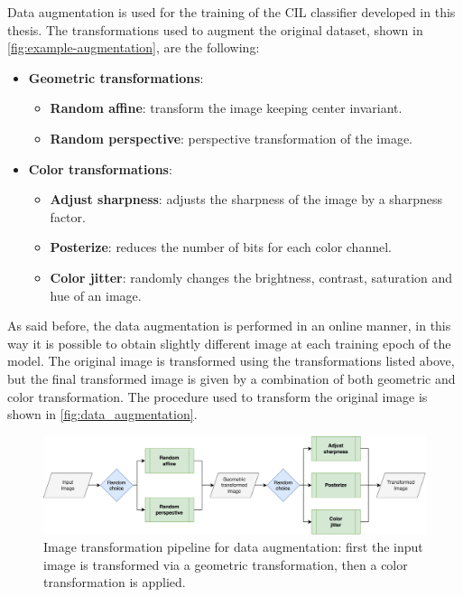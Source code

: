 Data augmentation is used for the training of the CIL classifier developed in this thesis. The transformations used to augment the original dataset, shown in \autoref{fig:example-augmentation}, are the following:
\begin{itemize}
    \item \textbf{Geometric transformations}:
    \begin{itemize}
        \item \textbf{Random affine}: transform the image keeping center invariant.
        \item \textbf{Random perspective}: perspective transformation of the image.
    \end{itemize}
    \item \textbf{Color transformations}:
    \begin{itemize}
        \item \textbf{Adjust sharpness}: adjusts the sharpness of the image by a sharpness factor.
        \item \textbf{Posterize}: reduces the number of bits for each color channel.
        \item \textbf{Color jitter}: randomly changes the brightness, contrast, saturation and hue of an image.
    \end{itemize}
\end{itemize}

As said before, the data augmentation is performed in an online manner, in this way it is possible to obtain slightly different image at each training epoch of the model. The original image is transformed using the transformations listed above, but the final transformed image is given by a combination of both geometric and color transformation. The procedure used to transform the original image is shown in \autoref{fig:data_augmentation}.


\begin{figure}%
	\centering

    \begin{center}
        \includegraphics[width=\columnwidth]{images/data_augmentation.drawio.png}
    \end{center}

	\caption{Image transformation pipeline for data augmentation: first the input image is transformed via a geometric transformation, then a color transformation is applied.}%
	\label{fig:data_augmentation}%
\end{figure}


